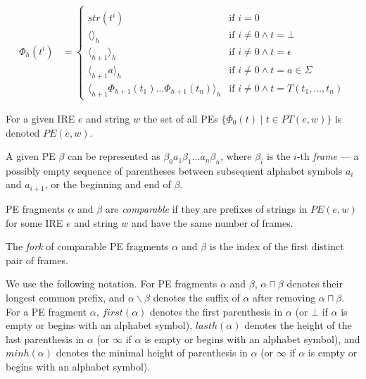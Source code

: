 \documentclass[AMA,STIX1COL]{WileyNJD-v2}
\newcommand{\Xl}{\langle}
\newcommand{\Xr}{\rangle}
\newcommand{\Xm}{\langle\!\rangle}
\newcommand{\PT}{PT}
\newcommand{\PE}{P\!E}
\begin{document}
    \begin{align*}
    \Phi_{h}(t^{i}) &= \begin{cases}
        &\\[-2em]
        str(t^{i})                                            &\text{if } i = 0 \\[-0.2em]
        \Xm_h                                                 &\text{if } i \neq 0 \wedge t = \bot \\[-0.2em]
        \Xl_{h+1} \Xr_h                                       &\text{if } i \neq 0 \wedge t = \epsilon \\[-0.2em]
        \Xl_{h+1} a \Xr_h                                     &\text{if } i \neq 0 \wedge t = a \in \Sigma \\[-0.2em]
        \Xl_{h+1} \Phi_{h+1}(t_1) \dots \Phi_{h+1}(t_n) \Xr_h &\text{if } i \neq 0 \wedge t = T(t_1, \dots, t_n)
    \end{cases}
    \end{align*}

For a given IRE $e$ and string $w$ the set of all PEs $\big\{ \Phi_{0}(t) \mid t \in \PT(e, w) \big\}$ is denoted $\PE(e, w)$.

    \begin{definition}
    \label{def_pe_frames}
    A given PE $\beta$ can be represented as $\beta_0 a_1 \beta_1 \dots a_n \beta_n$,
    where $\beta_i$ is the $i$-th \emph{frame} --- a possibly empty sequence of parentheses between
    subsequent alphabet symbols $a_i$ and $a_{i+1}$, or the beginning and end of $\beta$.
    \end{definition}

    \begin{definition}
    \label{def_pe_comparability}
    PE fragments $\alpha$ and $\beta$ are \emph{comparable}
    if they are prefixes of strings in $\PE(e, w)$ for some IRE $e$ and string $w$
    and have the same number of frames.
    \end{definition}

    \begin{definition}[Fork]
    The \emph{fork} of comparable PE fragments $\alpha$ and $\beta$ is the index of the first distinct pair of frames.
    \end{definition}

We use the following notation. For PE fragments $\alpha$ and $\beta$,
$\alpha \sqcap \beta$ denotes their longest common prefix,
and $\alpha \backslash \beta$ denotes the suffix of $\alpha$ after removing $\alpha \sqcap \beta$.
For a PE fragment $\alpha$,
$f\!irst(\alpha)$ denotes the first parenthesis in $\alpha$ (or $\bot$ if $\alpha$ is empty or begins with an alphabet symbol),
$lasth(\alpha)$ denotes the height of the last parenthesis in $\alpha$ (or $\infty$ if $\alpha$ is empty or begins with an alphabet symbol),
and $minh(\alpha)$ denotes the minimal height of parenthesis in $\alpha$ (or $\infty$ if $\alpha$ is empty or begins with an alphabet symbol).
\end{document}
